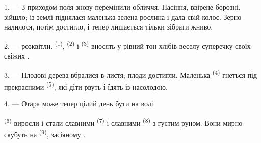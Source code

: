 %
%


\VUsaut{5.0mm}
\VUsaut{3.0mm}
\VUsaut{3.0mm}
\VUsaut{4.0mm}
\VUsaut{3.0mm}

1. --- З приходом  поля знову перемінили обличчя. Насіння, ввірене
борозні, зійшло; із землі піднялася маленька зелена рослина і дала свій колос.
Зерно налилося, потім достигло, і тепер лишається тільки зібрати жниво.

2. ---  розквітли.  \textsuperscript{(1)},
 \textsuperscript{(2)} і 
\textsuperscript{(3)} вносять у рівний тон хлібів веселу суперечку своїх свіжих
.

3. --- Плодові дерева вбралися в листя; плоди достигли. Маленька
 \textsuperscript{(4)} гнеться під прекрасними 
\textsuperscript{(5)}, які діти рвуть і їдять із насолодою.

4. --- Отара може тепер цілий день бути на волі.

 \textsuperscript{(6)} виросли і стали славними 
\textsuperscript{(7)} і славними  \textsuperscript{(8)} з густим
руном. Вони мирно скубуть  на 
\textsuperscript{(9)}, засіяному .

